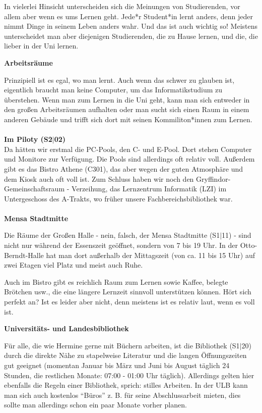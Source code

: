 {In vielerlei Hinsicht unterscheiden sich die Meinungen von Studierenden, vor allem aber wenn es ums Lernen geht. Jede*r Student*in lernt anders, denn jeder nimmt Dinge in seinem Leben anders wahr. Und das ist auch wichtig so! Meistens unterscheidet man aber diejenigen Studierenden, die zu Hause lernen, und die, die lieber in der Uni lernen.
}{
    \noindent\textbf{Arbeitsräume}

    Prinzipiell ist es egal, wo man lernt. Auch wenn das schwer zu glauben ist, eigentlich braucht man keine Computer, um das Informatikstudium zu überstehen. Wenn man zum Lernen in die Uni geht, kann man sich entweder in den großen Arbeitsräumen aufhalten oder man sucht sich einen Raum in einem anderen Gebäude und trifft sich dort mit seinen Kommiliton*innen zum Lernen.\\ \\
    \noindent\textbf{Im Piloty (S2$|$02)}\\
    Da hätten wir erstmal die PC-Pools, den C- und E-Pool. Dort stehen Computer und Monitore zur Verfügung. Die Pools sind allerdings oft relativ voll. Außerdem gibt es das Bistro Athene (C301), das aber wegen der guten Atmosphäre und dem Kiosk auch oft voll ist. Zum Schluss haben wir noch den Gryffindor-Gemeinschaftsraum - Verzeihung, das Lernzentrum Informatik (LZI) im Untergeschoss des A-Trakts, wo früher unsere Fachbereichsbibliothek war.\\ \\
    \noindent\textbf{Mensa Stadtmitte}

    Die Räume der Großen Halle - nein, falsch, der Mensa Stadtmitte (S1$|$11) - sind nicht nur während der Essenszeit geöffnet, sondern von 7 bis 19 Uhr. In der Otto-Berndt-Halle hat man dort außerhalb der Mittagszeit (von ca. 11 bis 15 Uhr) auf zwei Etagen viel Platz und meist auch Ruhe.

    Auch im Bistro gibt es reichlich Raum zum Lernen sowie Kaffee, belegte Brötchen usw., die eine längere Lernzeit sinnvoll unterstützen können. Hört sich perfekt an? Ist es leider aber nicht, denn meistens ist es relativ laut, wenn es voll ist.\\


    \noindent\textbf{Universitäts- und Landesbibliothek}

    Für alle, die wie Hermine gerne mit Büchern arbeiten, ist die Bibliothek (S1$|$20) durch die direkte Nähe zu stapelweise Literatur und die langen Öffnungszeiten gut geeignet (momentan Januar bis März und Juni bis August täglich 24 Stunden, die restlichen Monate: 07:00 - 01:00 Uhr täglich). Allerdings gelten hier ebenfalls die Regeln einer Bibliothek, sprich: stilles Arbeiten. In der ULB kann man sich auch kostenlos "`Büros"' z. B. für seine Abschlussarbeit mieten, dies sollte man allerdings schon ein paar Monate vorher planen.\\

}
